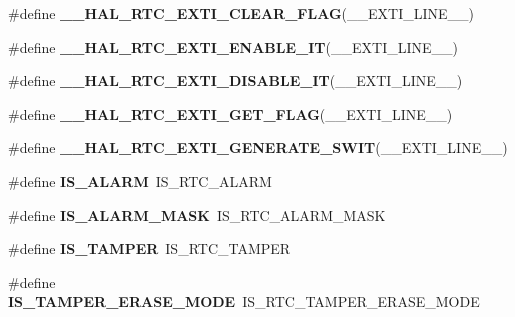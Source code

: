 \begin{DoxyCompactItemize}
\item 
\#define {\bfseries \-\_\-\-\_\-\-H\-A\-L\-\_\-\-R\-T\-C\-\_\-\-E\-X\-T\-I\-\_\-\-C\-L\-E\-A\-R\-\_\-\-F\-L\-A\-G}(\-\_\-\-\_\-\-E\-X\-T\-I\-\_\-\-L\-I\-N\-E\-\_\-\-\_\-)
\item 
\#define {\bfseries \-\_\-\-\_\-\-H\-A\-L\-\_\-\-R\-T\-C\-\_\-\-E\-X\-T\-I\-\_\-\-E\-N\-A\-B\-L\-E\-\_\-\-I\-T}(\-\_\-\-\_\-\-E\-X\-T\-I\-\_\-\-L\-I\-N\-E\-\_\-\-\_\-)
\item 
\#define {\bfseries \-\_\-\-\_\-\-H\-A\-L\-\_\-\-R\-T\-C\-\_\-\-E\-X\-T\-I\-\_\-\-D\-I\-S\-A\-B\-L\-E\-\_\-\-I\-T}(\-\_\-\-\_\-\-E\-X\-T\-I\-\_\-\-L\-I\-N\-E\-\_\-\-\_\-)
\item 
\#define {\bfseries \-\_\-\-\_\-\-H\-A\-L\-\_\-\-R\-T\-C\-\_\-\-E\-X\-T\-I\-\_\-\-G\-E\-T\-\_\-\-F\-L\-A\-G}(\-\_\-\-\_\-\-E\-X\-T\-I\-\_\-\-L\-I\-N\-E\-\_\-\-\_\-)
\item 
\#define {\bfseries \-\_\-\-\_\-\-H\-A\-L\-\_\-\-R\-T\-C\-\_\-\-E\-X\-T\-I\-\_\-\-G\-E\-N\-E\-R\-A\-T\-E\-\_\-\-S\-W\-I\-T}(\-\_\-\-\_\-\-E\-X\-T\-I\-\_\-\-L\-I\-N\-E\-\_\-\-\_\-)
\item 
\hypertarget{group___h_a_l___r_t_c___aliased___macros_ga7e6a2b69bd0cb85a1d44801ccb116e38}{\#define {\bfseries I\-S\-\_\-\-A\-L\-A\-R\-M}~I\-S\-\_\-\-R\-T\-C\-\_\-\-A\-L\-A\-R\-M}\label{group___h_a_l___r_t_c___aliased___macros_ga7e6a2b69bd0cb85a1d44801ccb116e38}

\item 
\hypertarget{group___h_a_l___r_t_c___aliased___macros_ga927c5de67a80c6ea175db864959df3e0}{\#define {\bfseries I\-S\-\_\-\-A\-L\-A\-R\-M\-\_\-\-M\-A\-S\-K}~I\-S\-\_\-\-R\-T\-C\-\_\-\-A\-L\-A\-R\-M\-\_\-\-M\-A\-S\-K}\label{group___h_a_l___r_t_c___aliased___macros_ga927c5de67a80c6ea175db864959df3e0}

\item 
\hypertarget{group___h_a_l___r_t_c___aliased___macros_ga720879737ff77db80e800545672cdb72}{\#define {\bfseries I\-S\-\_\-\-T\-A\-M\-P\-E\-R}~I\-S\-\_\-\-R\-T\-C\-\_\-\-T\-A\-M\-P\-E\-R}\label{group___h_a_l___r_t_c___aliased___macros_ga720879737ff77db80e800545672cdb72}

\item 
\hypertarget{group___h_a_l___r_t_c___aliased___macros_ga49cab06ba96add6f8dddac75414b468f}{\#define {\bfseries I\-S\-\_\-\-T\-A\-M\-P\-E\-R\-\_\-\-E\-R\-A\-S\-E\-\_\-\-M\-O\-D\-E}~I\-S\-\_\-\-R\-T\-C\-\_\-\-T\-A\-M\-P\-E\-R\-\_\-\-E\-R\-A\-S\-E\-\_\-\-M\-O\-D\-E}\label{group___h_a_l___r_t_c___aliased___macros_ga49cab06ba96add6f8dddac75414b468f}


\end{DoxyCompactItemize}
